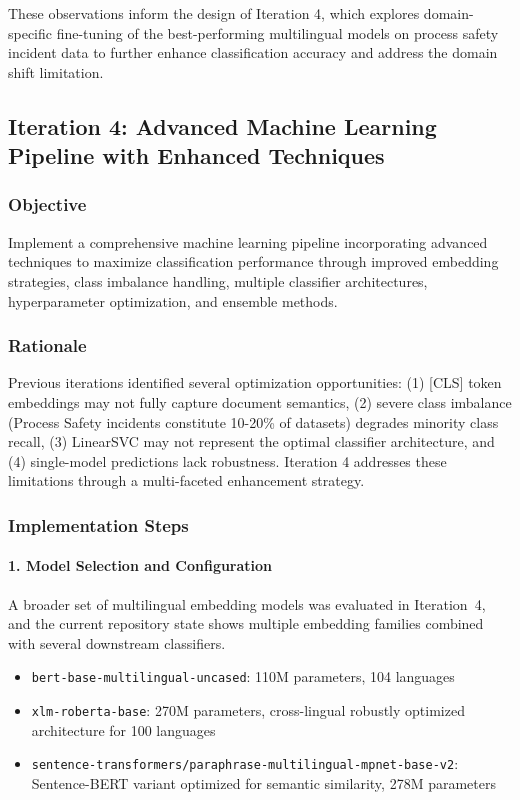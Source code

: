 \documentclass[11pt, titlepage, bibliography=totoc]{scrreprt}
\begin{document}
These observations inform the design of Iteration 4, which explores domain-specific fine-tuning of the best-performing multilingual models on process safety incident data to further enhance classification accuracy and address the domain shift limitation.

\subsection{Iteration 4: Advanced Machine Learning Pipeline with Enhanced Techniques}

\subsubsection{Objective}
Implement a comprehensive machine learning pipeline incorporating advanced techniques to maximize classification performance through improved embedding strategies, class imbalance handling, multiple classifier architectures, hyperparameter optimization, and ensemble methods.

\subsubsection{Rationale}
Previous iterations identified several optimization opportunities: (1) [CLS] token embeddings may not fully capture document semantics, (2) severe class imbalance (Process Safety incidents constitute 10-20\% of datasets) degrades minority class recall, (3) LinearSVC may not represent the optimal classifier architecture, and (4) single-model predictions lack robustness. Iteration 4 addresses these limitations through a multi-faceted enhancement strategy.

\subsubsection{Implementation Steps}

\paragraph{1. Model Selection and Configuration}
A broader set of multilingual embedding models was evaluated in Iteration~4, and the current repository state shows multiple embedding families combined with several downstream classifiers.

\begin{itemize}
    \item \texttt{bert-base-multilingual-uncased}: 110M parameters, 104 languages
    \item \texttt{xlm-roberta-base}: 270M parameters, cross-lingual robustly optimized architecture for 100 languages
    \item \texttt{sentence-transformers/paraphrase-multilingual-mpnet-base-v2}: Sentence-BERT variant optimized for semantic similarity, 278M parameters
\end{itemize}
\end{document}
